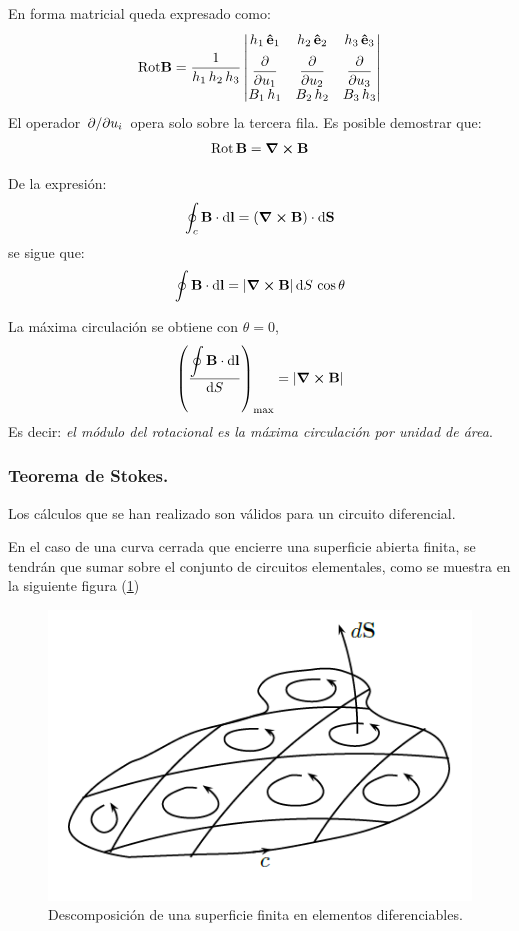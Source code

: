 \documentclass[12pt]{article}
\numberwithin{equation}{section}
\begin{document}
En forma matricial queda expresado como:
\begin{align*}
{\rm Rot} \vb{B} = \dfrac{1}{h_{1} \, h_{2} \, h_{3}} \mdet{
h_{1} \, \vu{e}_{1} & h_{2} \, \vu{e}_{2} & h_{3} \, \vu{e}_{3} \\[0.5em]
\displaystyle \pdv{u_{1}} & \displaystyle \pdv{u_{2}} & \displaystyle \pdv{u_{3}} \\[0.5em]
B_{1} \, h_{1} & B_{2} \, h_{2} & B_{3} \, h_{3}
}
\end{align*}
El operador $\pdv*{u_{i}}$ opera solo sobre la tercera fila. Es posible demostrar que:
\begin{align*}
{\rm Rot} \, \vb{B} = \curl{\vb{B}}
\end{align*}

De la expresión:
\begin{align*}
\oint_{c} \vb{B} \cdot \dd{\vb{l}} = (\curl{\vb{B}}) \cdot \dd{\vb{S}}
\end{align*}
se sigue que:
\begin{align*}
\oint \vb{B} \cdot \dd{\vb{l}} = \abs{\curl{\vb{B}}} \dd{S \, \cos \theta}
\end{align*}

La máxima circulación se obtiene con $\theta = 0$,
\begin{align*}
\left( \dfrac{\displaystyle \oint \vb{B} \cdot \dd{\vb{l}}}{\dd{S}} \right)_{\max} = \abs{\curl{\vb{B}}}
\end{align*}
Es decir: \emph{el módulo del rotacional es la máxima circulación por unidad de área}.

\subsubsection{Teorema de Stokes.}

Los cálculos que se han realizado son válidos para un circuito diferencial.
\par
En el caso de una curva cerrada que encierre una superficie abierta finita, se tendrán que sumar sobre el conjunto de circuitos elementales, como se muestra en la siguiente figura (\ref{fig:figura_superficie_elementos_diferenciables})

\begin{figure}[H]
    \centering
    \includegraphics[scale=0.75]{Imagenes/Superficie_Elementos_Diferenciables.png}
    \caption{Descomposición de una superficie finita en elementos diferenciables.}
    \label{fig:figura_superficie_elementos_diferenciables}
\end{figure}
\end{document}
